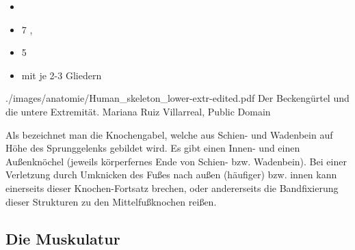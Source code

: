 {\begin{itemize}
    \begin{itemize}
        \item {}  (Tibia) , dick, vorne
           
        \item {}  (Fibula), dünn, seitlich
        hinten    
    \end{itemize}
    \item {}  
    \item 7 ,   
    \item 5   
    \item {} mit je 2-3 Gliedern
\end{itemize}
}
{./images/anatomie/Human_skeleton_lower-extr-edited.pdf}
{\AuthNotesPicLegalOk{}{}Der Beckengürtel und die untere Extremität.}
{Mariana Ruiz Villarreal, Public Domain}




Als  bezeichnet man die Knochengabel, welche aus
Schien- und Wadenbein auf Höhe des Sprunggelenks gebildet
wird. Es gibt einen Innen- und einen Außenknöchel (jeweils
körperfernes Ende von Schien- bzw. Wadenbein). Bei einer
Verletzung durch Umknicken des Fußes nach außen (häufiger)
bzw. innen kann einerseits dieser Knochen-Fortsatz brechen,
oder andererseits die Bandfixierung dieser Strukturen zu den
Mittelfußknochen reißen.


 

\subsection{Die Muskulatur}

